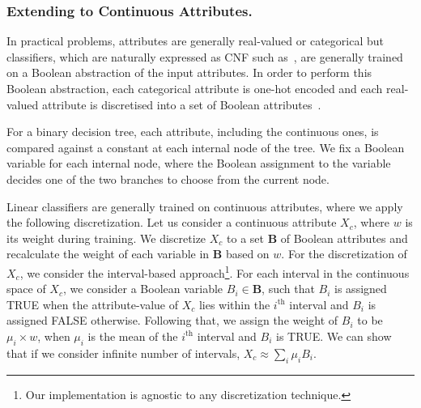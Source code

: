 \subsubsection{Extending to Continuous Attributes.}
In practical problems, attributes are generally real-valued or categorical but classifiers, which are naturally expressed as CNF such as~\cite{GMM20}, are generally trained on a Boolean abstraction of the input attributes.
In order to perform this Boolean abstraction, each categorical attribute is one-hot encoded and each real-valued attribute is discretised into a set of Boolean attributes~\cite{LKCL2019,GMM20}. 

For a binary decision tree, each attribute, including the continuous ones, is compared against a constant at each internal node of the tree. We fix a Boolean variable for each internal node, where the Boolean assignment to the variable decides one of the two branches to choose from the current node.  

Linear classifiers are generally trained on continuous attributes, where we apply the following discretization. 
Let us consider a continuous attribute $X_c$, where $w$ is its weight during training. 
We discretize $ X_c $ to a set $ \mathbf{B} $ of Boolean attributes and recalculate the weight of each variable in $ \mathbf{B} $ based on $ w $. 
For the discretization of $X_c$, we consider the interval-based approach\footnote{Our implementation is agnostic to any discretization technique.}. 
For each interval in the continuous space of $X_c$, we consider a Boolean variable $B_i \in \mathbf{B}$, such that $ B_i $ is assigned TRUE when the attribute-value of $X_c$ lies within the $i^{\mathrm{th}}$ interval and $ B_i $ is assigned FALSE otherwise. 
Following that, we assign the weight of $ B_i $ to be $ \mu_i\times w $, when $ \mu_i $ is the mean of the $i^{\mathrm{th}}$ interval and  $ B_i $ is TRUE. 
We can show that if we consider infinite number of intervals, $ X_c \approx \sum_i \mu_i B_i $. 

